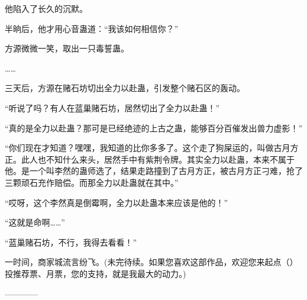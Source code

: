 \begin{this_body}
他陷入了长久的沉默。

半晌后，他才用心音蛊道：“我该如何相信你？”

方源微微一笑，取出一只毒誓蛊。

……

三天后，方源在赌石坊切出全力以赴蛊，引发整个赌石区的轰动。

“听说了吗？有人在蓝巢赌石坊，居然切出了全力以赴蛊！”

“真的是全力以赴蛊？那可是已经绝迹的上古之蛊，能够百分百催发出兽力虚影！”

“你们现在才知道？嘿嘿，我知道的比你多多了。这个走了狗屎运的，叫做古月方正。此人也不知什么来头，居然手中有紫荆令牌。其实全力以赴蛊，本来不属于他。是一个叫李然的蛊师选了，结果走路撞到了古月方正，被古月方正刁难，抢了三颗顽石充作赔偿。而那全力以赴蛊就在其中。”

“哎呀，这个李然真是倒霉啊，全力以赴蛊本来应该是他的！”

“这就是命啊……”

“蓝巢赌石坊，不行，我得去看看！”

一时间，商家城流言纷飞。(未完待续。如果您喜欢这部作品，欢迎您来起点（）投推荐票、月票，您的支持，就是我最大的动力。)

------------

\end{this_body}

